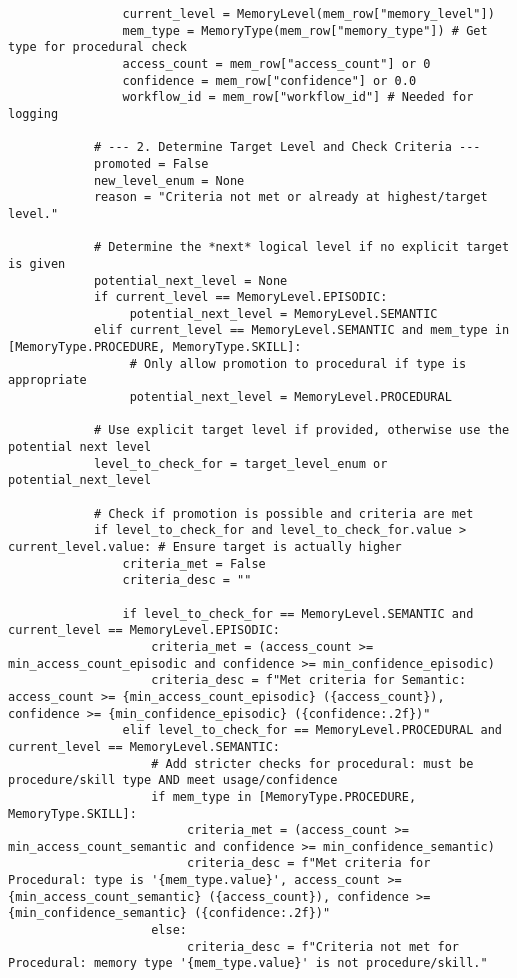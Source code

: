\documentclass[12pt,a4paper]{article}
\begin{document}
\begin{pageablecode}
\begin{verbatim}
                current_level = MemoryLevel(mem_row["memory_level"])
                mem_type = MemoryType(mem_row["memory_type"]) # Get type for procedural check
                access_count = mem_row["access_count"] or 0
                confidence = mem_row["confidence"] or 0.0
                workflow_id = mem_row["workflow_id"] # Needed for logging

            # --- 2. Determine Target Level and Check Criteria ---
            promoted = False
            new_level_enum = None
            reason = "Criteria not met or already at highest/target level."

            # Determine the *next* logical level if no explicit target is given
            potential_next_level = None
            if current_level == MemoryLevel.EPISODIC:
                 potential_next_level = MemoryLevel.SEMANTIC
            elif current_level == MemoryLevel.SEMANTIC and mem_type in [MemoryType.PROCEDURE, MemoryType.SKILL]:
                 # Only allow promotion to procedural if type is appropriate
                 potential_next_level = MemoryLevel.PROCEDURAL

            # Use explicit target level if provided, otherwise use the potential next level
            level_to_check_for = target_level_enum or potential_next_level

            # Check if promotion is possible and criteria are met
            if level_to_check_for and level_to_check_for.value > current_level.value: # Ensure target is actually higher
                criteria_met = False
                criteria_desc = ""

                if level_to_check_for == MemoryLevel.SEMANTIC and current_level == MemoryLevel.EPISODIC:
                    criteria_met = (access_count >= min_access_count_episodic and confidence >= min_confidence_episodic)
                    criteria_desc = f"Met criteria for Semantic: access_count >= {min_access_count_episodic} ({access_count}), confidence >= {min_confidence_episodic} ({confidence:.2f})"
                elif level_to_check_for == MemoryLevel.PROCEDURAL and current_level == MemoryLevel.SEMANTIC:
                    # Add stricter checks for procedural: must be procedure/skill type AND meet usage/confidence
                    if mem_type in [MemoryType.PROCEDURE, MemoryType.SKILL]:
                         criteria_met = (access_count >= min_access_count_semantic and confidence >= min_confidence_semantic)
                         criteria_desc = f"Met criteria for Procedural: type is '{mem_type.value}', access_count >= {min_access_count_semantic} ({access_count}), confidence >= {min_confidence_semantic} ({confidence:.2f})"
                    else:
                         criteria_desc = f"Criteria not met for Procedural: memory type '{mem_type.value}' is not procedure/skill."


\end{verbatim}
\end{pageablecode}
\end{document}
